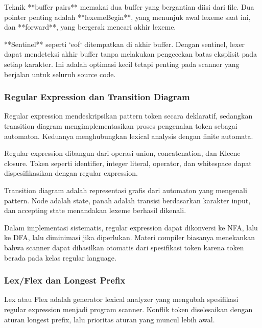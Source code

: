 Teknik **buffer pairs** memakai dua buffer yang bergantian diisi dari file. Dua pointer penting adalah **lexemeBegin**, yang menunjuk awal lexeme saat ini, dan **forward**, yang bergerak mencari akhir lexeme.

**Sentinel** seperti `eof` ditempatkan di akhir buffer. Dengan sentinel, lexer dapat mendeteksi akhir buffer tanpa melakukan pengecekan batas eksplisit pada setiap karakter. Ini adalah optimasi kecil tetapi penting pada scanner yang berjalan untuk seluruh source code.

\subsubsection{Regular Expression dan Transition Diagram}

\begin{jawab}
Regular expression mendeskripsikan pattern token secara deklaratif, sedangkan transition diagram mengimplementasikan proses pengenalan token sebagai automaton. Keduanya menghubungkan lexical analysis dengan finite automata.
\end{jawab}

Regular expression dibangun dari operasi union, concatenation, dan Kleene closure. Token seperti identifier, integer literal, operator, dan whitespace dapat dispesifikasikan dengan regular expression.

Transition diagram adalah representasi grafis dari automaton yang mengenali pattern. Node adalah state, panah adalah transisi berdasarkan karakter input, dan accepting state menandakan lexeme berhasil dikenali.

Dalam implementasi sistematis, regular expression dapat dikonversi ke NFA, lalu ke DFA, lalu diminimasi jika diperlukan. Materi compiler biasanya menekankan bahwa scanner dapat dihasilkan otomatis dari spesifikasi token karena token berada pada kelas regular language.

\subsubsection{Lex/Flex dan Longest Prefix}

\begin{jawab}
Lex atau Flex adalah generator lexical analyzer yang mengubah spesifikasi regular expression menjadi program scanner. Konflik token diselesaikan dengan aturan longest prefix, lalu prioritas aturan yang muncul lebih awal.
\end{jawab}

